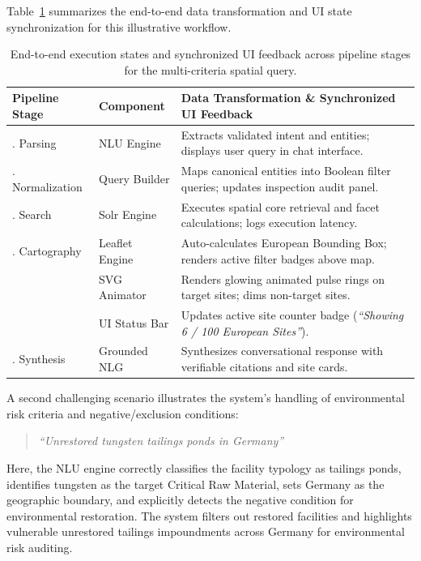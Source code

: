 Table~\ref{tab:walkthrough_states} summarizes the end-to-end data transformation and UI state synchronization for this illustrative workflow.

\begin{table}[h!]
\centering
\small
\setlength{\tabcolsep}{4pt}
\caption{End-to-end execution states and synchronized UI feedback across pipeline stages for the multi-criteria spatial query.}
\label{tab:walkthrough_states}
\begin{tabularx}{\linewidth}{>{\raggedright\arraybackslash}p{2.5cm}>{\raggedright\arraybackslash}p{2.4cm}>{\raggedright\arraybackslash}X}
\toprule
\textbf{Pipeline Stage} & \textbf{Component} & \textbf{Data Transformation \& Synchronized UI Feedback} \\
\midrule
1. Parsing & NLU Engine & Extracts validated intent and entities; displays user query in chat interface. \\
2. Normalization & Query Builder & Maps canonical entities into Boolean filter queries; updates inspection audit panel. \\
3. Search & Solr Engine & Executes spatial core retrieval and facet calculations; logs execution latency. \\
4. Cartography & Leaflet Engine & Auto-calculates European Bounding Box; renders active filter badges above map. \\
   & SVG Animator & Renders glowing animated pulse rings on target sites; dims non-target sites. \\
   & UI Status Bar & Updates active site counter badge (\textit{``Showing 6 / 100 European Sites''}). \\
5. Synthesis & Grounded NLG & Synthesizes conversational response with verifiable citations and site cards. \\
\bottomrule
\end{tabularx}
\end{table}

A second challenging scenario illustrates the system's handling of environmental risk criteria and negative/exclusion conditions:
\begin{quote}
\textit{``Unrestored tungsten tailings ponds in Germany''}
\end{quote}
Here, the NLU engine correctly classifies the facility typology as tailings ponds, identifies tungsten as the target Critical Raw Material, sets Germany as the geographic boundary, and explicitly detects the negative condition for environmental restoration. The system filters out restored facilities and highlights vulnerable unrestored tailings impoundments across Germany for environmental risk auditing.

